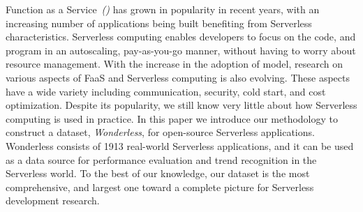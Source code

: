 Function as a Service~\emph{(\faas)} has grown in popularity in recent years, 
with an increasing number of applications being built benefiting from Serverless 
characteristics. Serverless computing enables developers to focus on the code, and 
program in an autoscaling,  pay-as-you-go manner, without having to worry 
about resource management. 
%
With the increase in the adoption of \faas model, research on various aspects 
of FaaS and Serverless computing is also evolving. These aspects have a wide 
variety including communication, security, cold start, and cost optimization. 
Despite its popularity, we still know very little about how Serverless computing 
is used in practice.
%
In this paper we introduce our methodology to construct a dataset, 
\emph{Wonderless}, for open-source Serverless applications. 
Wonderless consists of 1913 real-world Serverless applications, 
and it can be used as a data source for performance evaluation and 
trend recognition in the Serverless world. To the best of our knowledge, 
our dataset is the most comprehensive, and largest one toward a 
complete picture for Serverless development research.


